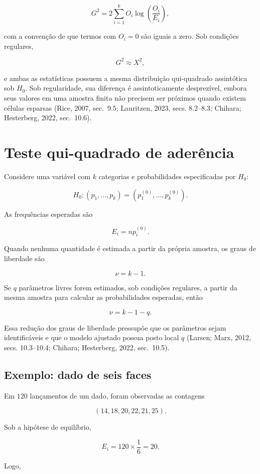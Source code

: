 \documentclass[
  letterpaper,
  DIV=11,
  numbers=noendperiod]{scrreprt}
\begin{document}
\[G^2
=
2\sum_{i=1}^k
O_i\log\left(\frac{O_i}{E_i}\right),\]

com a convenção de que termos com \(O_i=0\) são iguais a zero. Sob
condições regulares,

\[G^2\approx X^2,\]

e ambas as estatísticas possuem a mesma distribuição qui-quadrado
assintótica sob \(H_0\). Sob regularidade, sua diferença é
assintoticamente desprezível, embora seus valores em uma amostra finita
não precisem ser próximos quando existem células esparsas (Rice, 2007,
sec.~9.5; Lauritzen, 2023, secs. 8.2--8.3; Chihara; Hesterberg, 2022,
sec.~10.6).

\section{Teste qui-quadrado de
aderência}\label{teste-qui-quadrado-de-aderuxeancia}

Considere uma variável com \(k\) categorias e probabilidades
especificadas por \(H_0\):

\[H_0:(p_1,\ldots,p_k)=(p_1^{(0)},\ldots,p_k^{(0)}).\]

As frequências esperadas são

\[E_i=np_i^{(0)}.\]

Quando nenhuma quantidade é estimada a partir da própria amostra, os
graus de liberdade são

\[\nu=k-1.\]

Se \(q\) parâmetros livres forem estimados, sob condições regulares, a
partir da mesma amostra para calcular as probabilidades esperadas, então

\[\nu=k-1-q.\]

Essa redução dos graus de liberdade pressupõe que os parâmetros sejam
identificáveis e que o modelo ajustado possua posto local \(q\) (Larsen;
Marx, 2012, secs. 10.3--10.4; Chihara; Hesterberg, 2022, sec.~10.5).

\subsection{Exemplo: dado de seis
faces}\label{exemplo-dado-de-seis-faces}

Em \(120\) lançamentos de um dado, foram observadas as contagens

\[(14,18,20,22,21,25).\]

Sob a hipótese de equilíbrio,

\[E_i=120\times\frac{1}{6}=20.\]

Logo,
\end{document}
